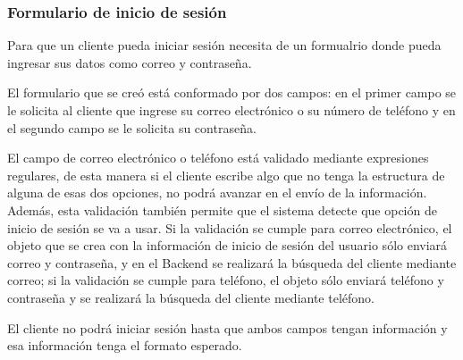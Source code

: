 \subsubsection{Formulario de inicio de sesión}
Para que un cliente pueda iniciar sesión necesita de un formualrio donde pueda ingresar sus datos como correo y contraseña.

El formulario que se creó está conformado por dos campos: en el primer campo se le solicita al cliente que ingrese su correo electrónico o su número de teléfono y en el segundo campo se le solicita su contraseña.

El campo de correo electrónico o teléfono está validado mediante expresiones regulares, de esta manera si el cliente escribe algo que no tenga la estructura de alguna de esas dos opciones, no podrá avanzar en el envío de la información. Además, esta validación también permite que el sistema detecte que opción de inicio de sesión se va a usar. Si la validación se cumple para correo electrónico, el objeto que se crea con la información de inicio de sesión del usuario sólo enviará correo y contraseña, y en el Backend se realizará la búsqueda del cliente mediante correo; si la validación se cumple para teléfono, el objeto sólo enviará teléfono y contraseña y se realizará la búsqueda del cliente mediante teléfono.

El cliente no podrá iniciar sesión hasta que ambos campos tengan información y esa información tenga el formato esperado.